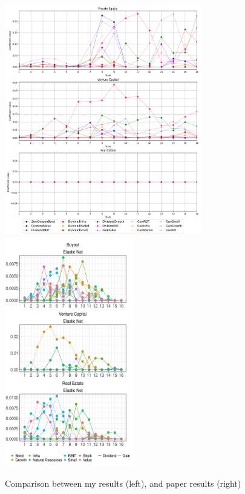 \documentclass[12pt]{article}
\begin{document}
        \begin{figure}[h!]
            \centering
            \includegraphics[height=10cm]{img/img_3}
            \hspace{1em} %
            \includegraphics[height=10cm]{img/img_paper}
            \caption{Comparison between my results (left), and paper results (right)}
            \label{fig:betas}
        \end{figure}
\end{document}
